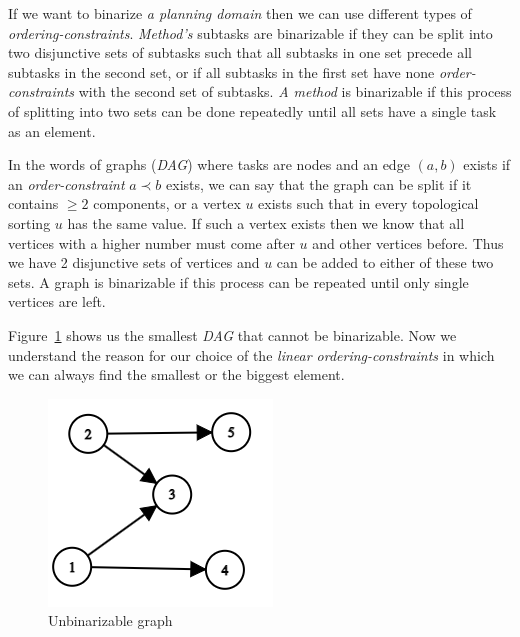 \begin{example}\label{ex04:7}
    If we want to binarize \emph{a planning domain} then we can use different types of \emph{ordering-constraints}. \emph{Method's} subtasks are binarizable if they can be split into two disjunctive sets of subtasks such that all subtasks in one set precede all subtasks in the second set, or if all subtasks in the first set have none \emph{order-constraints} with the second set of subtasks. \emph{A method} is binarizable if this process of splitting into two sets can be done repeatedly until all sets have a single task as an element. 
    
    In the words of graphs (\emph{DAG}) where tasks are nodes and an edge $(a,b)$ exists if an \emph{order-constraint} $a \prec b$ exists, we can say that the graph can be split if it contains $\geq 2$ components, or a vertex $u$ exists such that in every topological sorting $u$ has the same value. If such a vertex exists then we know that all vertices with a higher number must come after $u$ and other vertices before. Thus we have 2 disjunctive sets of vertices and $u$ can be added to either of these two sets. A graph is binarizable if this process can be repeated until only single vertices are left.

    Figure~\ref{fig04:3} shows us the smallest \emph{DAG} that cannot be binarizable. Now we understand the reason for our choice of the \emph{linear ordering-constraints} in which we can always find the smallest or the biggest element.
    
    \begin{figure}
        \centering
        \includegraphics{img/graph.png}
        \caption{Unbinarizable graph}
        \label{fig04:3}
    \end{figure}
\end{example}


